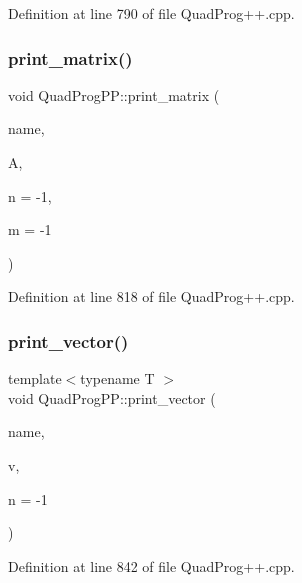Definition at line 790 of file Quad\+Prog++.\+cpp.

\hypertarget{namespaceQuadProgPP_affeed53f80844aaf2be84ac637cfd212}{}\label{namespaceQuadProgPP_affeed53f80844aaf2be84ac637cfd212} 
\subsubsection{\texorpdfstring{print\+\_\+matrix()}{print\_matrix()}}
{\footnotesize\ttfamily void Quad\+Prog\+P\+P\+::print\+\_\+matrix (\begin{DoxyParamCaption}\item[{const char $\ast$}]{name,  }\item[{const Eigen\+::\+Matrix\+Xd \&}]{A,  }\item[{int}]{n = {\ttfamily -\/1},  }\item[{int}]{m = {\ttfamily -\/1} }\end{DoxyParamCaption})}



Definition at line 818 of file Quad\+Prog++.\+cpp.

\hypertarget{namespaceQuadProgPP_a5a7e0a2f22b7bf72667010d6cff1dac2}{}\label{namespaceQuadProgPP_a5a7e0a2f22b7bf72667010d6cff1dac2} 
\subsubsection{\texorpdfstring{print\+\_\+vector()}{print\_vector()}}
{\footnotesize\ttfamily template$<$typename T $>$ \\
void Quad\+Prog\+P\+P\+::print\+\_\+vector (\begin{DoxyParamCaption}\item[{const char $\ast$}]{name,  }\item[{const Eigen\+::\+Matrix$<$ T, Eigen\+::\+Dynamic, 1 $>$ \&}]{v,  }\item[{int}]{n = {\ttfamily -\/1} }\end{DoxyParamCaption})}



Definition at line 842 of file Quad\+Prog++.\+cpp.

\hypertarget{namespaceQuadProgPP_ad183104d932d3764cc3223e89591c347}{}\label{namespaceQuadProgPP_ad183104d932d3764cc3223e89591c347} 
